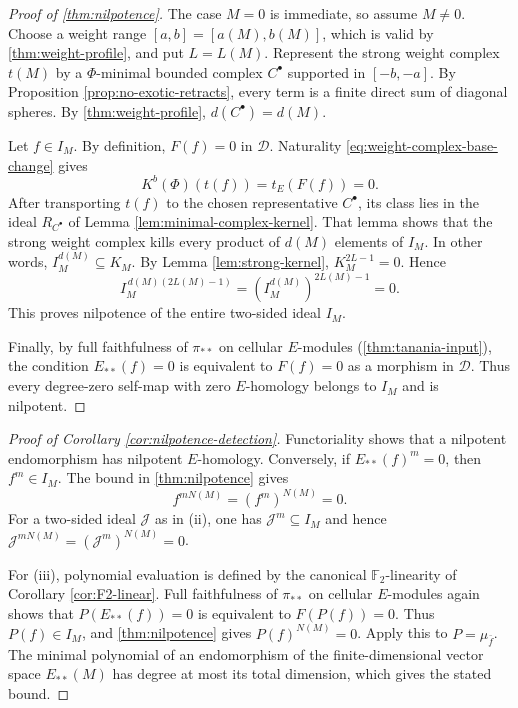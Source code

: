 \documentclass[11pt]{amsart}
\numberwithin{equation}{section}
\theoremstyle{definition}
\theoremstyle{remark}
\newcommand{\F}{\mathbb F_2}
\newcommand{\D}{\mathcal D}
\begin{document}
\begin{proof}[Proof of \cref{thm:nilpotence}]
The case $M=0$ is immediate, so assume $M\ne0$.  Choose a weight range
$[a,b]=[a(M),b(M)]$, which is valid by \cref{thm:weight-profile}, and put
$L=L(M)$.  Represent the strong weight complex
$t(M)$ by a $\Phi$-minimal bounded complex $C^\bullet$ supported in
$[-b,-a]$.  By Proposition \ref{prop:no-exotic-retracts}, every term is a finite direct
sum of diagonal spheres.  By \cref{thm:weight-profile},
$d(C^\bullet)=d(M)$.

Let $f\in I_M$.  By definition, $F(f)=0$ in $\D$.  Naturality
\eqref{eq:weight-complex-base-change} gives
\[
  K^b(\Phi)(t(f))=t_E(F(f))=0.
\]
After transporting $t(f)$ to the chosen representative $C^\bullet$, its
class lies in the ideal $R_{C^\bullet}$ of Lemma 
\ref{lem:minimal-complex-kernel}.  That lemma shows that the strong weight
complex kills every product of $d(M)$ elements of $I_M$.  In other words,
$I_M^{d(M)}\subseteq K_M.$
By Lemma \ref{lem:strong-kernel}, $K_M^{2L-1}=0$.  Hence
\[
  I_M^{\,d(M)(2L(M)-1)}
  =(I_M^{d(M)})^{2L(M)-1}=0.
\]
This proves nilpotence of the entire two-sided ideal $I_M$.

Finally, by full faithfulness of $\pi_{**}$ on cellular $E$-modules
(\cref{thm:tanania-input}), the condition $E_{**}(f)=0$ is equivalent to
$F(f)=0$ as a morphism in $\D$.  Thus every degree-zero self-map with zero
$E$-homology belongs to $I_M$ and is nilpotent.
\end{proof}

\begin{proof}[Proof of Corollary \ref{cor:nilpotence-detection}]
Functoriality shows that a nilpotent endomorphism has nilpotent
$E$-homology.  Conversely, if $E_{**}(f)^m=0$, then $f^m\in I_M$.
The bound in \cref{thm:nilpotence} gives
\[
  f^{mN(M)}=(f^m)^{N(M)}=0.
\]
For a two-sided ideal $\mathcal J$ as in (ii), one has
$\mathcal J^m\subseteq I_M$ and hence
$\mathcal J^{mN(M)}=(\mathcal J^m)^{N(M)}=0$.

For (iii), polynomial evaluation is defined by the canonical $\F$-linearity
of Corollary \ref{cor:F2-linear}.  Full faithfulness of $\pi_{**}$ on cellular $E$-modules
again shows that $P(E_{**}(f))=0$ is equivalent to
$F(P(f))=0$.  Thus $P(f)\in I_M$, and \cref{thm:nilpotence} gives
$P(f)^{N(M)}=0$.  Apply this to $P=\mu_{\bar f}$.  The minimal polynomial of
an endomorphism of the finite-dimensional vector space $E_{**}(M)$ has degree
at most its total dimension, which gives the stated bound.
\end{proof}
\end{document}
